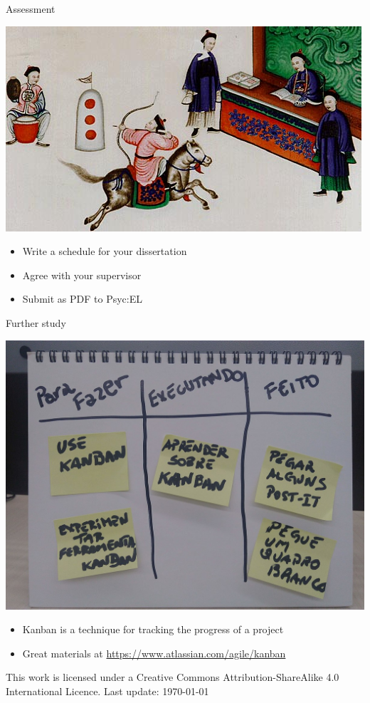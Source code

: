 \documentclass{beamer}
\begin{document}
\begin{frame}{Assessment}
    \centerline{
  \includegraphics[width=.8\textwidth]{pics/Qing_military_exam_1.jpg}
}

  \begin{itemize}
    \item Write a schedule for your dissertation
    \item Agree with your supervisor
    \item Submit as PDF to Psyc:EL
  \end{itemize}
\end{frame}

\begin{frame}{Further study}
    \centerline{
  \includegraphics[width=.5\textwidth]{pics/Simples-Quadro-Kanban-03.jpg}
}
  
  \begin{itemize}
  \item Kanban is a technique for tracking the progress of a project
    \item Great materials at \url{https://www.atlassian.com/agile/kanban}
  \end{itemize}
\end{frame}

\tiny
This work is licensed under a Creative Commons Attribution-ShareAlike
4.0 International Licence. Last update: \today
\end{document}

